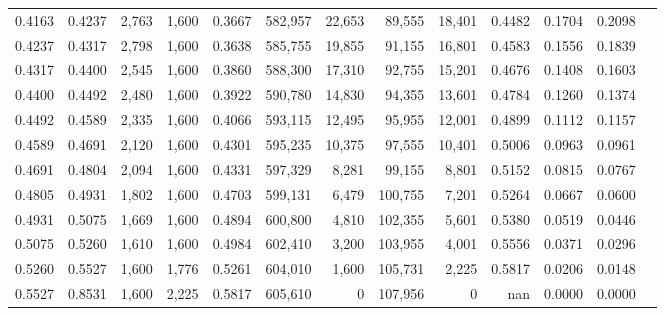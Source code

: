 \begin{tabular}{rrrrrrrrrrrrr}
0.4163 & 0.4237 &  2,763 & 1,600 &                                     0.3667 & 582,957 &  22,653 &  89,555 &  18,401 & 0.4482 & 0.1704 & 0.2098 \\
0.4237 & 0.4317 &  2,798 & 1,600 &                                     0.3638 & 585,755 &  19,855 &  91,155 &  16,801 & 0.4583 & 0.1556 & 0.1839 \\
0.4317 & 0.4400 &  2,545 & 1,600 &                                     0.3860 & 588,300 &  17,310 &  92,755 &  15,201 & 0.4676 & 0.1408 & 0.1603 \\
0.4400 & 0.4492 &  2,480 & 1,600 &                                     0.3922 & 590,780 &  14,830 &  94,355 &  13,601 & 0.4784 & 0.1260 & 0.1374 \\
0.4492 & 0.4589 &  2,335 & 1,600 &                                     0.4066 & 593,115 &  12,495 &  95,955 &  12,001 & 0.4899 & 0.1112 & 0.1157 \\
0.4589 & 0.4691 &  2,120 & 1,600 &                                     0.4301 & 595,235 &  10,375 &  97,555 &  10,401 & 0.5006 & 0.0963 & 0.0961 \\
0.4691 & 0.4804 &  2,094 & 1,600 &                                     0.4331 & 597,329 &   8,281 &  99,155 &   8,801 & 0.5152 & 0.0815 & 0.0767 \\
0.4805 & 0.4931 &  1,802 & 1,600 &                                     0.4703 & 599,131 &   6,479 & 100,755 &   7,201 & 0.5264 & 0.0667 & 0.0600 \\
0.4931 & 0.5075 &  1,669 & 1,600 &                                     0.4894 & 600,800 &   4,810 & 102,355 &   5,601 & 0.5380 & 0.0519 & 0.0446 \\
0.5075 & 0.5260 &  1,610 & 1,600 &                                     0.4984 & 602,410 &   3,200 & 103,955 &   4,001 & 0.5556 & 0.0371 & 0.0296 \\
0.5260 & 0.5527 &  1,600 & 1,776 &                                     0.5261 & 604,010 &   1,600 & 105,731 &   2,225 & 0.5817 & 0.0206 & 0.0148 \\
0.5527 & 0.8531 &  1,600 & 2,225 &                                     0.5817 & 605,610 &       0 & 107,956 &       0 &    nan & 0.0000 & 0.0000 \\
\bottomrule
\end{tabular}
